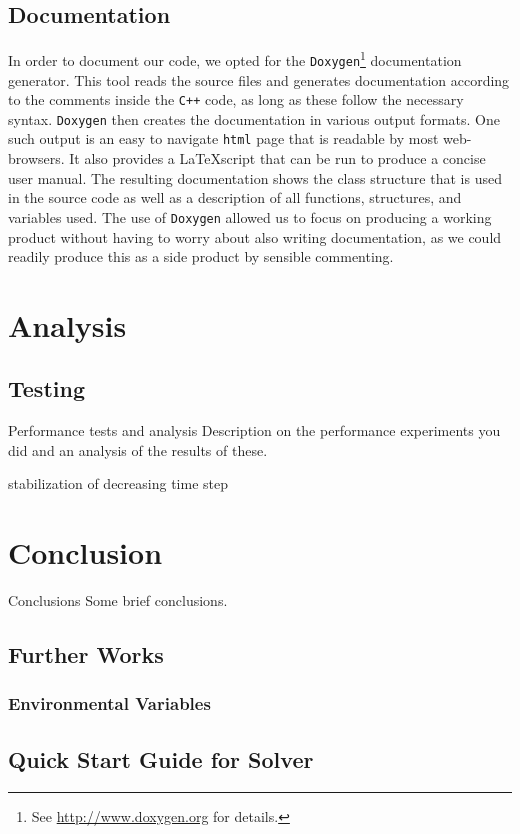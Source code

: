\documentclass[a4paper,11pt]{article}
\begin{document}
 \subsection{Documentation}

In order to document our code, we opted for the \texttt{Doxygen}\footnote{See \url{http://www.doxygen.org} for details.} documentation generator. This tool reads the source files and generates documentation according to the comments inside the \texttt{C++} code, as long as these follow the necessary syntax. \texttt{Doxygen} then creates the documentation in various output formats. One such output is an easy to navigate \texttt{html} page that is readable by most web-browsers. It also provides a \LaTeX  script that can be run to produce a concise user manual. The resulting documentation shows the class structure that is used in the source code as well as a description of all functions, structures, and variables used. The use of \texttt{Doxygen} allowed us to focus on producing a working product without having to worry about also writing documentation, as we could readily produce this as a side product by sensible commenting.   
 
 \section{Analysis}
 
 \subsection{Testing}
Performance tests and analysis Description on the performance experiments you did and an analysis
of the results of these.

stabilization of decreasing time step
 
 
 \section{Conclusion}
Conclusions Some brief conclusions.
 
\subsection{Further Works}

\subsubsection{Environmental Variables}



\newpage
\begin{appendices}
\section{Quick Start Guide for Solver}
\end{appendices}
\end{document}
